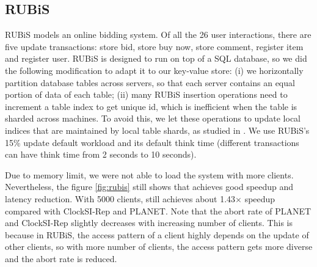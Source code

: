 \subsection{RUBiS}
RUBiS \cite{rubis} models an online bidding system. Of all the 26 user interactions, there are five update transactions: store bid, store buy now, store comment, register item and register user. RUBiS is designed to run on top of a SQL database, so we did the following modification to adapt it to our key-value store: (i) we horizontally partition database tables across servers, so that each server contains an equal portion of data of each table; (ii) many RUBiS insertion operations need to increment a table index to get unique id, which is inefficient when the table is sharded across machines. To avoid this, we let these operations to update local indices that are maintained by local table shards, as studied in \cite{cecchet2008middleware}. We use RUBiS's 15\% update default workload and its default think time (different transactions can have think time from 2 seconds to 10 seconds).

Due to memory limit, we were not able to load the system with more clients. Nevertheless, the figure \ref{fig:rubis} still shows that \specula achieves good speedup and latency reduction. With 5000 clients, \specula still achieves about 1.43$\times$ speedup compared with ClockSI-Rep and PLANET. Note that the abort rate of PLANET and ClockSI-Rep slightly decreases with increasing number of clients. This is because in RUBiS, the access pattern of a client highly depends on the update of other clients, so with more number of clients, the access pattern gets more diverse and the abort rate is reduced.


